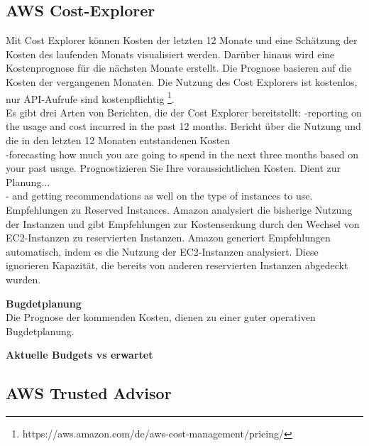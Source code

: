 \subsection{AWS Cost-Explorer}
Mit Cost Explorer können Kosten der letzten 12 Monate und eine Schätzung der Kosten des laufenden Monats visualisiert werden. Darüber hinaus wird eine Kostenprognose für die nächsten Monate erstellt. Die Prognose basieren auf die Kosten der vergangenen Monaten.
Die Nutzung des Cost Explorers ist kostenlos, nur API-Aufrufe sind kostenpflichtig \footnote{https://aws.amazon.com/de/aws-cost-management/pricing/}.
\\
Es gibt drei Arten von Berichten, die der Cost Explorer bereitstellt:
-reporting on the usage and cost incurred in the past 12 months.
Bericht über die Nutzung und die in den letzten 12 Monaten entstandenen Kosten
\\
-forecasting how much you are going to spend in the next three months based on your past usage.
Prognostizieren Sie Ihre voraussichtlichen Kosten.
Dient zur Planung...
\\
- and getting recommendations as well on the type of instances to use.
Empfehlungen zu Reserved Instances.
Amazon analysiert die bisherige Nutzung der Instanzen und gibt Empfehlungen zur Kostensenkung durch den Wechsel von EC2-Instanzen zu reservierten Instanzen.
Amazon generiert Empfehlungen automatisch, indem es die Nutzung der EC2-Instanzen analysiert.
Diese ignorieren Kapazität, die bereits von anderen reservierten Instanzen abgedeckt wurden.

\textbf{Bugdetplanung}\\
Die Prognose der kommenden Kosten, dienen zu einer guter operativen Bugdetplanung.


\textbf{Aktuelle Budgets vs erwartet}\\

\subsection{AWS Trusted Advisor}

